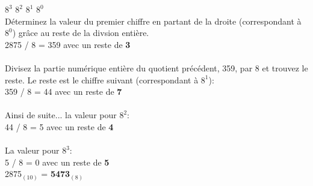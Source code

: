 \begin{Exercice}[20 minutes]
\begin{solution}
        $8^3$   $8^2$   $8^1$   $8^0$ \\

        Déterminez la valeur du premier chiffre en partant de la droite (correspondant à $8^0$) grâce au reste de la divsion entière.\\
        2875 / 8 = 359 avec un reste de \textbf{3}\\\\
        Divisez la partie numérique entière du quotient précédent, 359, par 8 et trouvez le reste. Le reste est le chiffre suivant (correspondant à $8^1$):\\
        359 / 8 = 44 avec un reste de \textbf{7}\\\\
        Ainsi de suite... la valeur pour $8^2$:\\
        44 / 8 = 5 avec un reste de \textbf{4}\\\\
        La valeur pour $8^3$:\\
        5 / 8 = 0 avec un reste de \textbf{5}\\

        2875$_{(10)}$ = \textbf{5473$_{(8)}$}    
    \end{solution} 

\end{Exercice}

